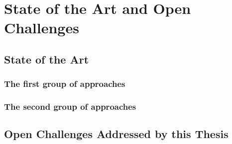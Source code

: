 
\chapter{State of the Art and Open Challenges}

\section{State of the Art}

\blindtext


\subsection*{The first group of approaches}
\label{subsec_FirstGroupRelated}
\blindtext
\cite{AspectJ}

\subsection*{The second group of approaches}
\label{subsec_SecondGroupRelated}
\blindtext
\cite{Hoorn2009,Hoorn2012,Rohr2008}

\section{Open Challenges Addressed by this Thesis}

\blindtext


